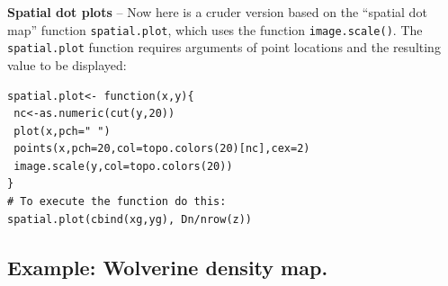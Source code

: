{\bf Spatial dot plots } -- Now here is a cruder version based on the
``spatial dot map'' function \mbox{\tt spatial.plot}, which uses
the function \mbox{\tt image.scale()}.
The \mbox{\tt spatial.plot} function requires arguments of point
locations and the resulting value to be displayed:
\begin{verbatim}
spatial.plot<- function(x,y){
 nc<-as.numeric(cut(y,20))
 plot(x,pch=" ")
 points(x,pch=20,col=topo.colors(20)[nc],cex=2)
 image.scale(y,col=topo.colors(20))
}
# To execute the function do this:
spatial.plot(cbind(xg,yg), Dn/nrow(z))
\end{verbatim}

\subsection{Example: Wolverine density map. }

